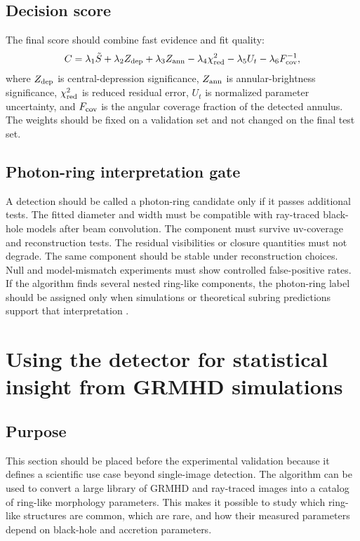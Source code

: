 \documentclass[11pt]{article}
\begin{document}
\subsection{Decision score}
The final score should combine fast evidence and fit quality:
\begin{equation}
    C = \lambda_1 \tilde{S} + \lambda_2 Z_{\rm dep} + \lambda_3 Z_{\rm ann} - \lambda_4 \chi^2_{\rm red} - \lambda_5 U_t - \lambda_6 F_{\rm cov}^{-1},
\end{equation}
where $Z_{\rm dep}$ is central-depression significance, $Z_{\rm ann}$ is annular-brightness significance, $\chi^2_{\rm red}$ is reduced residual error, $U_t$ is normalized parameter uncertainty, and $F_{\rm cov}$ is the angular coverage fraction of the detected annulus. The weights should be fixed on a validation set and not changed on the final test set.

\subsection{Photon-ring interpretation gate}
A detection should be called a photon-ring candidate only if it passes additional tests. The fitted diameter and width must be compatible with ray-traced black-hole models after beam convolution. The component must survive uv-coverage and reconstruction tests. The residual visibilities or closure quantities must not degrade. The same component should be stable under reconstruction choices. Null and model-mismatch experiments must show controlled false-positive rates. If the algorithm finds several nested ring-like components, the photon-ring label should be assigned only when simulations or theoretical subring predictions support that interpretation \citep{Johnson2020,Wielgus2022,Vincent2022,Jia2024}.

\section{Using the detector for statistical insight from GRMHD simulations}

\subsection{Purpose}
This section should be placed before the experimental validation because it defines a scientific use case beyond single-image detection. The algorithm can be used to convert a large library of GRMHD and ray-traced images into a catalog of ring-like morphology parameters. This makes it possible to study which ring-like structures are common, which are rare, and how their measured parameters depend on black-hole and accretion parameters.
\end{document}
